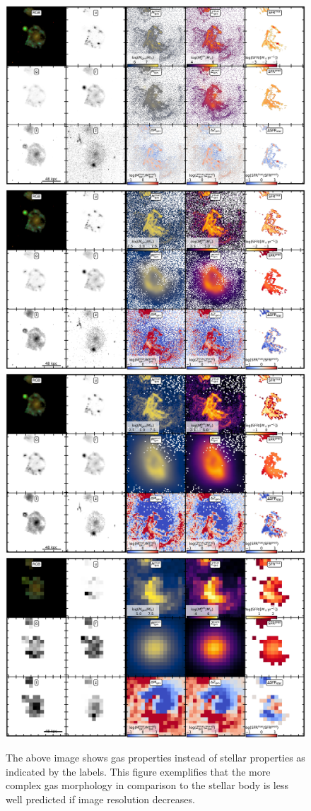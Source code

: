 \documentclass[conference]{IEEEtran}
\begin{document}
\begin{figure}
\vspace{-.25cm}
\begin{center}
\includegraphics[width=.49\textwidth]{./plots/2096_masked_gas.pdf}
\includegraphics[width=.49\textwidth]{./plots/2096_masked_gas_2.pdf}
\includegraphics[width=.49\textwidth]{./plots/2096_masked_gas_4.pdf}
\includegraphics[width=.49\textwidth]{./plots/2096_masked_gas_16.pdf}
\end{center}
\vspace{-.35cm}
\caption{The above image shows gas properties instead of stellar properties as indicated by the labels. This figure exemplifies that the more complex gas morphology in comparison to the stellar body is less well predicted if image resolution decreases.
}
\label{fig:app_res_comp_gas}
\end{figure}
\end{document}
